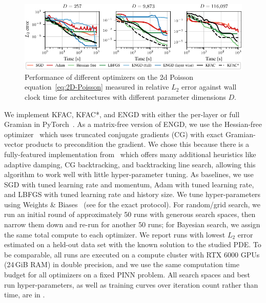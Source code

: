 \begin{figure}[t]
  \centering
  \includegraphics{kfac_pinns_exp/exp17_groupplot_poisson2d/l2_error_over_time.pdf}
  \caption{Performance of different optimizers on the 2d Poisson equation~\eqref{eq:2D-Poisson} measured in relative $L_2$ error against wall clock time for architectures with different parameter dimensions $D$.}
  \label{fig:2D-Poisson}
\end{figure}

We implement KFAC, KFAC*, and ENGD with either the per-layer or full Gramian in PyTorch~\citep{paszke2019pytorch}.
As a matrix-free version of ENGD, we use the Hessian-free optimizer~\citep{martens2010deep} which uses truncated conjugate gradients (CG) with exact Gramian-vector products to precondition the gradient.
We chose this because there is a fully-featured implementation from~\citet{tatzel2022late} which offers many additional heuristics like adaptive damping, CG backtracking, and backtracking line search, allowing this algorithm to work well with little hyper-parameter tuning.
As baselines, we use SGD with tuned learning rate and momentum, Adam with tuned learning rate, and LBFGS with tuned learning rate and history size.
We tune hyper-parameters using Weights \& Biases~\citep{wandb} (see  for the exact protocol).
For random/grid search, we run an initial round of approximately 50 runs with generous search spaces, then narrow them down and re-run for another 50 runs; for Bayesian search, we assign the same total compute to each optimizer.
We report runs with lowest $L_2$ error estimated on a held-out data set with the known solution to the studied PDE.
To be comparable, all runs are executed on a compute cluster with RTX 6000 GPUs (24\,GiB RAM) in double precision, and we use the same computation time budget for all optimizers on a fixed PINN problem.
All search spaces and best run hyper-parameters, as well as training curves over iteration count rather than time, are in .

